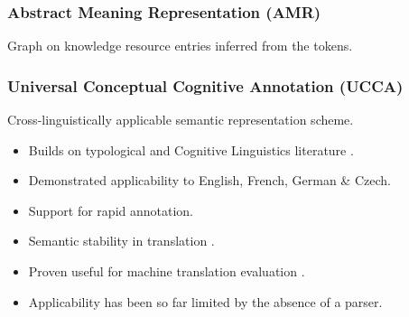 \documentclass[t]{beamer}
\begin{document}
\begin{frame}
\frametitle{Abstract Meaning Representation (AMR)}
Graph on knowledge resource entries inferred from the tokens.

\end{frame}

\begin{frame}
\frametitle{Universal Conceptual Cognitive Annotation (UCCA)}
\centering
\vfill
Cross-linguistically applicable semantic representation scheme.
\begin{itemize}
 \item Builds on typological \parencite{Dixon:basic}
 	and Cognitive Linguistics literature \cite{croft2004cognitive}.
 \item Demonstrated applicability to English, French, German \& Czech.
 \item Support for rapid annotation.
 \item Semantic stability in translation \cite{sulem2015conceptual}.
 \item Proven useful for machine translation evaluation \cite{birch2016hume}.
 \item Applicability has been so far limited by the absence of a parser.
\end{itemize}
\vfill
\end{frame}
\end{document}
